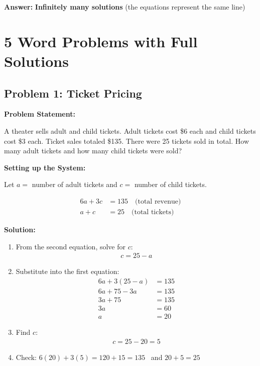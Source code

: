 \documentclass{article}
\begin{document}
\textbf{Answer:} \textbf{Infinitely many solutions} (the equations represent the same line) \,  

\section{5 Word Problems with Full Solutions}

\subsection{Problem 1: Ticket Pricing}

\textbf{Problem Statement:}

A theater sells adult and child tickets. Adult tickets cost \$6 each and child tickets cost \$3 each. Ticket sales totaled \$135. There were 25 tickets sold in total. How many adult tickets and how many child tickets were sold?

\textbf{Setting up the System:}

Let $a =$ number of adult tickets and $c =$ number of child tickets.

\begin{align*}
6a + 3c &= 135 \quad \text{(total revenue)} \\
a + c &= 25 \quad \text{(total tickets)}
\end{align*}

\textbf{Solution:}

\begin{enumerate}
    \item From the second equation, solve for $c$:
    \begin{align*}
        c = 25 - a
    \end{align*}
    \item Substitute into the first equation:
    \begin{align*}
        6a + 3(25 - a) &= 135 \\
        6a + 75 - 3a &= 135 \\
        3a + 75 &= 135 \\
        3a &= 60 \\
        a &= 20
    \end{align*}
    \item Find $c$:
    \begin{align*}
        c = 25 - 20 = 5
    \end{align*}
    \item Check: $6(20) + 3(5) = 120 + 15 = 135$ \,  and $20 + 5 = 25$ \, 
\end{enumerate}
\end{document}
